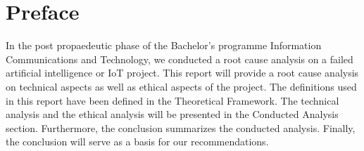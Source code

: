 \chapter*{Preface}

In the post propaedeutic phase of the Bachelor’s programme Information Communications and Technology, we conducted a root cause analysis
on a failed artificial intelligence or IoT project. This report will provide a root cause analysis on technical aspects as well as ethical
aspects of the project. The definitions used in this report have been defined in the Theoretical Framework. The technical analysis and the ethical analysis will be presented in the Conducted Analysis section. Furthermore, the conclusion summarizes the conducted analysis. Finally, the conclusion will serve as a basis for our recommendations.